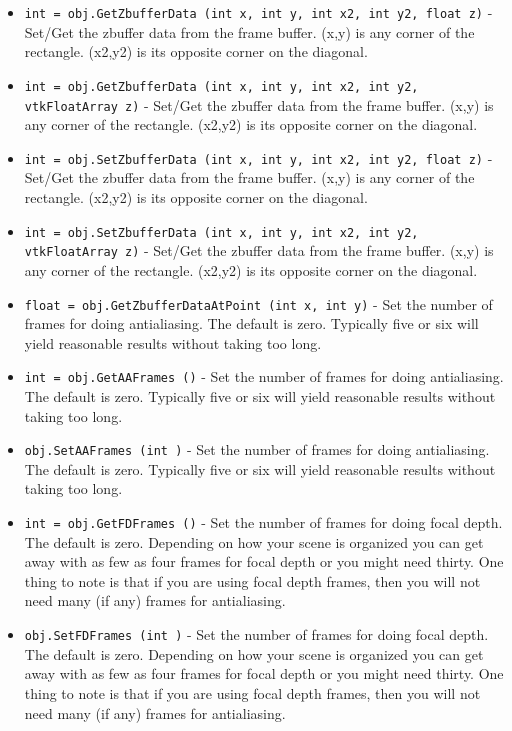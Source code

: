 \begin{itemize}
\item  \verb|int = obj.GetZbufferData (int x, int y, int x2, int y2, float z)| -  Set/Get the zbuffer data from the frame buffer.
 (x,y) is any corner of the rectangle. (x2,y2) is its opposite corner on
 the diagonal.

\item  \verb|int = obj.GetZbufferData (int x, int y, int x2, int y2, vtkFloatArray z)| -  Set/Get the zbuffer data from the frame buffer.
 (x,y) is any corner of the rectangle. (x2,y2) is its opposite corner on
 the diagonal.

\item  \verb|int = obj.SetZbufferData (int x, int y, int x2, int y2, float z)| -  Set/Get the zbuffer data from the frame buffer.
 (x,y) is any corner of the rectangle. (x2,y2) is its opposite corner on
 the diagonal.

\item  \verb|int = obj.SetZbufferData (int x, int y, int x2, int y2, vtkFloatArray z)| -  Set/Get the zbuffer data from the frame buffer.
 (x,y) is any corner of the rectangle. (x2,y2) is its opposite corner on
 the diagonal.

\item  \verb|float = obj.GetZbufferDataAtPoint (int x, int y)| -  Set the number of frames for doing antialiasing. The default is
 zero. Typically five or six will yield reasonable results without
 taking too long.

\item  \verb|int = obj.GetAAFrames ()| -  Set the number of frames for doing antialiasing. The default is
 zero. Typically five or six will yield reasonable results without
 taking too long.

\item  \verb|obj.SetAAFrames (int )| -  Set the number of frames for doing antialiasing. The default is
 zero. Typically five or six will yield reasonable results without
 taking too long.

\item  \verb|int = obj.GetFDFrames ()| -  Set the number of frames for doing focal depth. The default is zero.
 Depending on how your scene is organized you can get away with as
 few as four frames for focal depth or you might need thirty.
 One thing to note is that if you are using focal depth frames,
 then you will not need many (if any) frames for antialiasing.

\item  \verb|obj.SetFDFrames (int )| -  Set the number of frames for doing focal depth. The default is zero.
 Depending on how your scene is organized you can get away with as
 few as four frames for focal depth or you might need thirty.
 One thing to note is that if you are using focal depth frames,
 then you will not need many (if any) frames for antialiasing.


\end{itemize}
